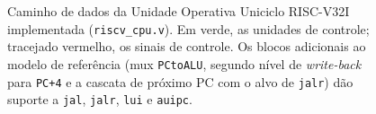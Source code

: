 \begin{figure}[!t]
{}
\caption{Caminho de dados da Unidade Operativa Uniciclo RISC-V32I implementada
(\texttt{riscv\_cpu.v}). Em verde, as unidades de controle; tracejado vermelho, os
sinais de controle. Os blocos adicionais ao modelo de refer\^encia (mux \texttt{PCtoALU},
segundo n\'ivel de \emph{write-back} para \texttt{PC+4} e a cascata de pr\'oximo PC com
o alvo de \texttt{jalr}) d\~ao suporte a \texttt{jal}, \texttt{jalr}, \texttt{lui} e \texttt{auipc}.}
\label{fig:datapath}
\end{figure}
